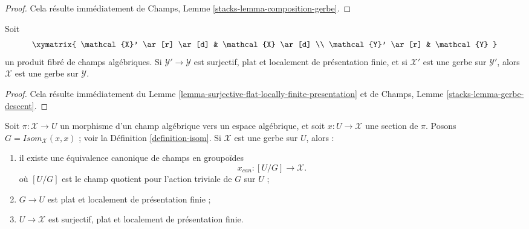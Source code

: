 \begin{proof}
Cela résulte immédiatement de Champs, Lemme
\ref{stacks-lemma-composition-gerbe}.
\end{proof}

\begin{lemma}
\label{lemma-gerbe-descent}
Soit
$$
\xymatrix{
\mathcal{X}' \ar[r] \ar[d] & \mathcal{X} \ar[d] \\
\mathcal{Y}' \ar[r] & \mathcal{Y}
}
$$
un produit fibré de champs algébriques. Si
$\mathcal{Y}' \to \mathcal{Y}$ est surjectif, plat et localement de
présentation finie, et si $\mathcal{X}'$ est une gerbe sur
$\mathcal{Y}'$, alors $\mathcal{X}$ est une gerbe sur $\mathcal{Y}$.
\end{lemma}

\begin{proof}
Cela résulte immédiatement du
Lemme \ref{lemma-surjective-flat-locally-finite-presentation} et de Champs,
Lemme \ref{stacks-lemma-gerbe-descent}.
\end{proof}

\begin{lemma}
\label{lemma-gerbe-with-section}
Soit $\pi : \mathcal{X} \to U$ un morphisme d'un champ algébrique vers un
espace algébrique, et soit $x : U \to \mathcal{X}$ une section de $\pi$.
Posons $G = \mathit{Isom}_\mathcal{X}(x, x)$ ; voir la
Définition \ref{definition-isom}. Si $\mathcal{X}$ est une gerbe sur
$U$, alors :
\begin{enumerate}
\item il existe une équivalence canonique de champs en groupoïdes
$$
x_{can} : [U/G] \longrightarrow \mathcal{X}.
$$
où $[U/G]$ est le champ quotient pour l'action triviale de $G$ sur $U$ ;
\item $G \to U$ est plat et localement de présentation finie ;
\item $U \to \mathcal{X}$ est surjectif, plat et localement de présentation
finie.
\end{enumerate}
\end{lemma}


